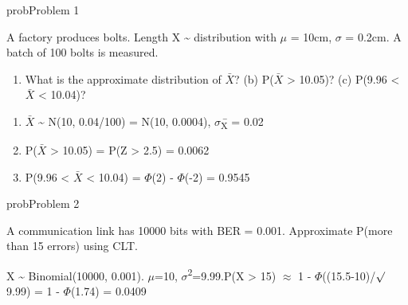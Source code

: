 \begin{PSbox}[unbreakable]{prob}{Problem 1}

A factory produces bolts. Length X \textasciitilde{} distribution with \ensuremath{\mu} = 10cm, \ensuremath{\sigma} = 0.2cm. A batch of 100 bolts is measured.

\begin{enumerate}
\def\labelenumi{(\alph{enumi})}
\tightlist
\item
  What is the approximate distribution of \ensuremath{\bar{X}}? (b) P(\ensuremath{\bar{X}} \textgreater{} 10.05)? (c) P(9.96 \textless{} \ensuremath{\bar{X}} \textless{} 10.04)?
\end{enumerate}

\PSsolution{} 

\begin{enumerate}
\def\labelenumi{(\alph{enumi})}
\tightlist
\item
  \ensuremath{\bar{X}} \textasciitilde{} N(10, 0.04/100) = N(10, 0.0004), \ensuremath{\sigma}\textsubscript{X}̄ = 0.02
\item
  P(\ensuremath{\bar{X}} \textgreater{} 10.05) = P(Z \textgreater{} 2.5) = 0.0062
\item
  P(9.96 \textless{} \ensuremath{\bar{X}} \textless{} 10.04) = \ensuremath{\Phi}(2) - \ensuremath{\Phi}(-2) = 0.9545
\end{enumerate}

\end{PSbox}

\begin{PSbox}[unbreakable]{prob}{Problem 2}

A communication link has 10000 bits with BER = 0.001. Approximate P(more than 15 errors) using CLT.

\PSsolution{} X \textasciitilde{} Binomial(10000, 0.001). \ensuremath{\mu}=10, \ensuremath{\sigma}\textsuperscript{2}=9.99.\PSbr{}P(X \textgreater{} 15) \ensuremath{\approx} 1 - \ensuremath{\Phi}((15.5-10)/\ensuremath{\surd}9.99) = 1 - \ensuremath{\Phi}(1.74) = 0.0409

\end{PSbox}

